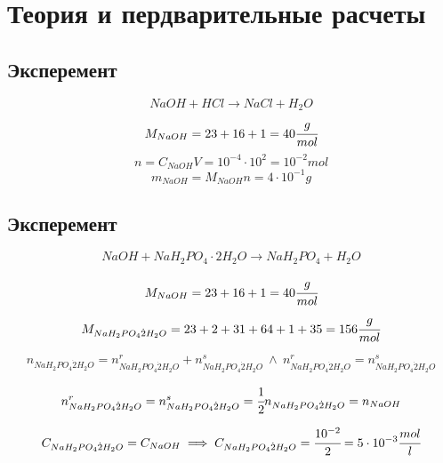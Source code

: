 \documentclass[a4paper]{article}
\numberwithin{equation}{section}
\begin{document}
\section{Теория и пердварительные расчеты}
\subsection{Эксперемент}
\begin{equation} 
    NaOH + HCl \to NaCl + H_2O 
\end{equation} 
\begin{equation*} 
    M_{NaOH} = 23 + 16 + 1 = 40 \cfrac{g}{mol}
\end{equation*} 
\begin{equation*} 
    n = C_{NaOH} V = 10^{ - 4} \cdot 10^2 = 10^{ - 2} mol
\end{equation*} 
\begin{equation} 
    m_{NaOH} = M_{NaOH} n = 4 \cdot 10^{ - 1} g
\end{equation}  

\subsection{Эксперемент}
\begin{equation} 
    NaOH + NaH_2PO_4 \cdot 2 H_2 O \to NaH_2PO_4 + H_2 O
\end{equation} 

\begin{equation*} 
    M_{NaOH} = 23 + 16 + 1 = 40 \cfrac{g}{mol}
\end{equation*} 
\begin{equation*} 
    M_{NaH_2PO_4 \dot 2 H_2 O} = 23 + 2 +  31 + 64 + 1 + 35 = 156 \cfrac{g}{mol}
\end{equation*}

\begin{equation*} 
    n_{NaH_2PO_4 \dot 2 H_2 O} = n^{r}_{NaH_2PO_4 \dot 2 H_2 O} 
    + n^{s}_{NaH_2PO_4 \dot 2 H_2 O} 
    \ \land \      
    n^{r}_{NaH_2PO_4 \dot 2 H_2 O} = n^{s}_{NaH_2PO_4 \dot 2 H_2 O} 
\end{equation*} 

\begin{equation*}    
    n^{r}_{NaH_2PO_4 \dot 2 H_2 O} = n^{s}_{NaH_2PO_4 \dot 2 H_2 O} =
    \cfrac{1}{2} n_{NaH_2PO_4 \dot 2 H_2 O} = n_{NaOH}
\end{equation*} 

\begin{equation} 
  C_{NaH_2PO_4 \dot 2 H_2 O} = C_{NaOH} \implies 
  C_{NaH_2PO_4 \dot 2 H_2 O} = \cfrac{10^{ - 2} }{2} = 
  5 \cdot 10^{ - 3} \cfrac{mol}{l}
\end{equation} 
\end{document}
